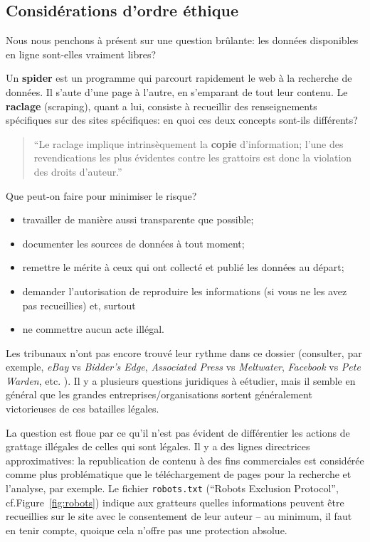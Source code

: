\subsection{Consid\'erations d'ordre éthique} Nous nous penchons à présent sur une question brûlante: les données disponibles en ligne sont-elles vraiment libres? 
\par Un \textbf{spider} est un programme qui parcourt rapidement le web à la recherche de données. Il s'aute d'une page à l'autre, en s'emparant de tout leur contenu. Le \textbf{raclage} (scraping), quant a lui, consiste à recueillir des renseignements spécifiques sur des sites  spécifiques: en quoi ces deux concepts sont-ils différents? 
\begin{quote}``Le raclage implique intrinsèquement la \textbf{copie} d’information; l'une des revendications les plus évidentes contre les grattoirs est donc  la violation des droits d'auteur.'' \cite{DC_MRMN}\end{quote}
Que peut-on faire pour minimiser le risque? 
\begin{itemize}[noitemsep]
\item travailler de manière aussi transparente que possible;
\item documenter les sources de données à tout moment;
\item remettre le mérite à ceux qui ont collecté et publié les données au départ;
\item demander l'autorisation de reproduire les informations (si vous ne les avez pas recueillies) et, surtout
\item ne commettre aucun acte illégal.
\end{itemize}
Les tribunaux n'ont pas encore trouvé leur rythme dans ce dossier (consulter, par exemple, \textit{eBay} vs \textit{Bidder's Edge}, \textit{Associated Press} vs \textit{Meltwater}, \textit{Facebook} vs \textit{Pete Warden}, etc. \cite{DC_M}). Il y a plusieurs questions juridiques \`a eétudier, mais il semble en général que les grandes entreprises/organisations sortent généralement victorieuses de ces batailles légales. \par La question est floue par ce qu’il n’est pas évident de différentier les actions de grattage illégales de celles qui sont légales. Il y a des lignes directrices approximatives: la republication de contenu à des fins commerciales est considérée comme plus problématique que le téléchargement de pages pour la recherche et l'analyse, par exemple. Le fichier \texttt{robots.txt} (``Robots Exclusion Protocol'', cf.\@ Figure~\ref{fig:robots}) indique aux gratteurs quelles informations peuvent être recueillies sur le site avec le consentement de leur auteur -- au minimum, il faut en tenir compte, quoique cela n'offre pas une protection absolue.
